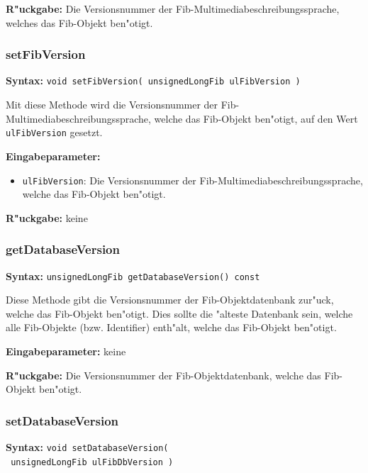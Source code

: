 \bigskip\noindent
\textbf{R"uckgabe:} Die Versionsnummer der Fib-Mul\-ti\-media\-be\-schrei\-bungs\-sprache, welches das Fib-Objekt ben"otigt.


\subsubsection{setFibVersion}

\textbf{Syntax:} \verb|void setFibVersion( unsignedLongFib ulFibVersion )|

\bigskip\noindent
Mit diese Methode wird die Versionsnummer der Fib-Multi\-media\-be\-schrei\-bungs\-spra\-che, welche das Fib-Objekt ben"otigt, auf den Wert \verb|ulFibVersion| gesetzt.

\bigskip\noindent
\textbf{Eingabeparameter:}
\begin{itemize}
 \item \verb|ulFibVersion|: Die Versionsnummer der Fib-Multi\-media\-be\-schrei\-bungs\-spra\-che, welche das Fib-Objekt ben"otigt.
\end{itemize}

\bigskip\noindent
\textbf{R"uckgabe:} keine


\subsubsection{getDatabaseVersion}

\textbf{Syntax:} \verb|unsignedLongFib getDatabaseVersion() const|

\bigskip\noindent
Diese Methode gibt die Versionsnummer der Fib-Objektdatenbank zur"uck, welche das Fib-Objekt ben"otigt. Dies sollte die "alteste Datenbank sein, welche alle Fib-Objekte (bzw. Identifier) enth"alt, welche das Fib-Objekt ben"otigt.

\bigskip\noindent
\textbf{Eingabeparameter:} keine

\bigskip\noindent
\textbf{R"uckgabe:} Die Versionsnummer der Fib-Objektdatenbank, welche das Fib-Objekt ben"otigt.


\subsubsection{setDatabaseVersion}

\textbf{Syntax:} \verb|void setDatabaseVersion(| \\\verb| unsignedLongFib ulFibDbVersion )|


